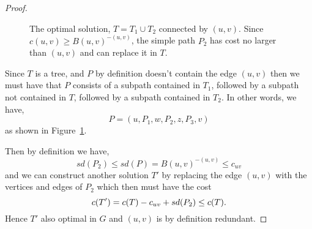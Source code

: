 \begin{proof}
\begin{figure}[h!]
\begin{tikzpicture}[auto, node distance=1.3 cm]
  \end{tikzpicture}
  \caption{The optimal solution, $T = T_1 \cup T_2$ connected by $(u,v)$.
    Since $c(u,v) \geq B(u,v)^{-(u,v)}$,
  the simple path $P_2$ has cost no larger than $(u,v)$ and can replace it in $T$.}\label{fig:red:test:sd:thm}
\end{figure}
   
   Since $T$ is a tree, and $P$ by definition doesn't contain the edge $(u,v)$
   then we must have that $P$ consists of a subpath contained in $T_1$, followed by
   a subpath not contained in $T$, followed by a subpath contained in $T_2$.
   In other words, we have,
   $$P = (u, P_1, w, P_2, z, P_3, v)$$
   as shown in Figure~\ref{fig:red:test:sd:thm}.

   Then by definition we have,
   $$sd(P_2) \leq sd(P) = B(u,v)^{-(u,v)} \leq c_{uv}$$
   and we can construct another solution $T'$ by replacing the edge
   $(u,v)$ with the
   vertices and edges of $P_2$ which then must have the cost
   $$c(T') = c(T) - c_{uv} + sd(P_2) \leq c(T)\mathnormal{.}$$
   Hence $T'$ also optimal in $G$ and $(u,v)$ is by definition redundant.
\end{proof}


